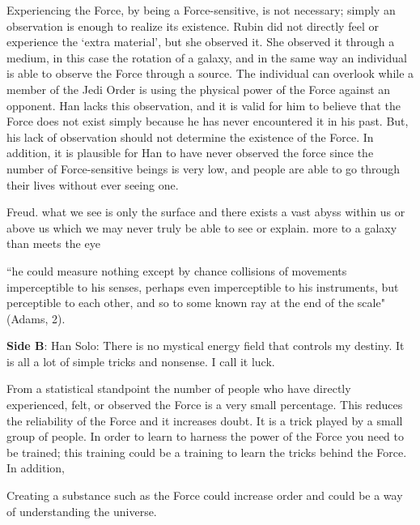 \documentclass[11pt, oneside]{article}
\begin{document}
\par Experiencing the Force, by being a Force-sensitive, is not necessary; simply an observation is enough to realize its existence. Rubin did not directly feel or experience the `extra material', but she observed it. She observed it through a medium, in this case the rotation of a galaxy, and in the same way an individual is able to observe the Force through a source. The individual can overlook while a member of the Jedi Order is using the physical power of the Force against an opponent. Han lacks this observation, and it is valid for him to believe that the Force does not exist simply because he has never encountered it in his past. But, his lack of observation should not determine the existence of the Force. In addition, it is plausible for Han to have never observed the force since the number of Force-sensitive beings is very low, and people are able to go through their lives without ever seeing one. 

\par Freud. what we see is only the surface and there exists a vast abyss within us or above us which we may never truly be able to see or explain. more to a galaxy than meets the eye

\par ``he could measure nothing except by chance collisions of movements imperceptible to his senses, perhaps even imperceptible to his instruments, but perceptible to each other, and so to some known ray at the end of the scale" (Adams, 2).

\newpage 

\noindent \textbf{Side B}: Han Solo: There is no mystical energy field that controls my destiny.  It is all a lot of simple tricks and nonsense. I call it luck. 

\par From a statistical standpoint the number of people who have directly experienced, felt, or observed the Force is a very small percentage. This reduces the reliability of the Force and it increases doubt. It is a trick played by a small group of people. In order to learn to harness the power of the Force you need to be trained; this training could be a training to learn the tricks behind the Force. In addition,

\par Creating a substance such as the Force could increase order and could be a way of understanding the universe.
\end{document}
